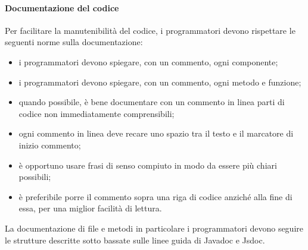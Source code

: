 	\paragraph{Documentazione del codice}
	Per facilitare la manutenibilità del codice, i programmatori devono rispettare le seguenti norme sulla documentazione:
	\begin{itemize}
		\item i programmatori devono spiegare, con un commento, ogni componente;
		\item i programmatori devono spiegare, con un commento, ogni metodo e funzione;
		\item quando possibile, è bene documentare con un commento in linea parti di codice non immediatamente comprensibili;
		\item ogni commento in linea deve recare uno spazio tra il testo e il marcatore di inizio commento;
		\item è opportuno usare frasi di senso compiuto in modo da essere più chiari possibili;
		\item è preferibile porre il commento sopra una riga di codice anziché alla fine di essa, per una miglior facilità di lettura.
	\end{itemize}
	La documentazione di file e metodi in particolare i programmatori devono seguire le strutture descritte sotto bassate sulle linee guida di Javadoc e Jsdoc.
